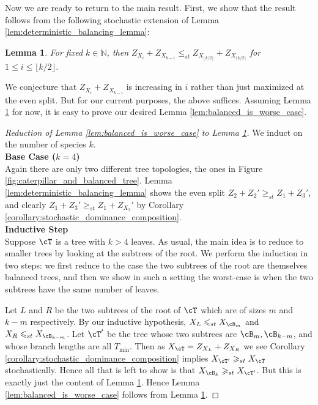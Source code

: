 \documentclass[10pt,oneside,reqno]{article}
\theoremstyle{plain}
\newtheorem{lemma}[theorem]{Lemma}
\theoremstyle{definition}
\numberwithin{equation}{section}
\renewcommand{\leq}{\leqslant}
\renewcommand{\geq}{\geqslant}
\newcommand{\N}{\mathbb{N}}
\begin{document}

\noindent Now we are ready to return to the main result. First, we show that the result follows from the following stochastic extension of Lemma \ref{lem:deterministic_balancing_lemma}:

\begin{lemma}
    For fixed $k \in \N$, then $Z_{X_i} + Z_{X_{k-i}} \leq_{st} Z_{X_{\lfloor k/2\rfloor}} + Z_{X_{\lceil k/2\rceil}}$ for $1 \leq i \leq \lfloor k/2\rfloor$. 
    \label{lem:the_more_balanced_the_better}
\end{lemma}

\noindent We conjecture that $Z_{X_i} + Z_{X_{k-i}}$ is increasing in $i$ rather than just maximized at the even split. But for our current purposes, the above suffices. Assuming Lemma \ref{lem:the_more_balanced_the_better} for now, it is easy to prove our desired Lemma \ref{lem:balanced_is_worse_case}.

\begin{proof}[Reduction of Lemma \ref{lem:balanced_is_worse_case} to Lemma \ref{lem:the_more_balanced_the_better}]
 We induct on the number of species $k$.\\

\noindent \textbf{Base Case ($k = 4$)}\\
\noindent Again there are only two different tree topologies, the ones in Figure \ref{fig:caterpillar_and_balanced_tree}. Lemma \ref{lem:deterministic_balancing_lemma} shows the even split $Z_2 + Z_2' \geq_{st} Z_1  + Z_3'$, and clearly $Z_1 + Z_3' \geq_{st} Z_1 + Z_{X_3}'$ by Corollary \ref{corollary:stochastic_dominance_composition}.\\

\noindent \textbf{Inductive Step}\\
\noindent Suppose $\cT$ is a tree with $k > 4$ leaves. As usual, the main idea is to reduce to smaller trees by looking at the subtrees of the root. We perform the induction in two steps: we first reduce to the case the two subtrees of the root are themselves balanced trees, and then we show in such a setting the worst-case is when the two subtrees have the same number of leaves. 

Let $L$ and $R$ be the two subtrees of the root of $\cT$ which are of sizes $m$ and $k-m$ respectively. By our inductive hypothesis, $X_L \leq_{st} X_{\cB_m}$ and $X_R \leq_{st} X_{\cB_{k-m}}$. Let $\cT'$ be the tree whose two subtrees are $\cB_m, \cB_{k-m}$, and whose branch lengths are all $T_{\mathrm{min}}$. Then as $X_\cT = Z_{X_L} + Z_{X_R}$ we see Corollary \ref{corollary:stochastic_dominance_composition} implies $X_{\cT'} \geq_{st} X_{\cT}$ stochastically. Hence all that is left to show is that $X_{\cB_k} \geq_{st} X_{\cT'}$. But this is exactly just the content of Lemma \ref{lem:the_more_balanced_the_better}. Hence Lemma \ref{lem:balanced_is_worse_case} follows from Lemma \ref{lem:the_more_balanced_the_better}.
\end{proof}
\end{document}

